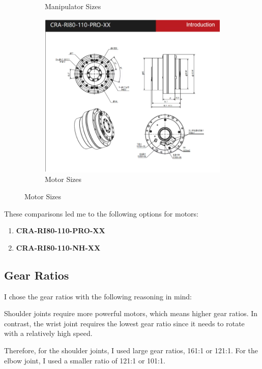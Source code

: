 \documentclass{article}
\begin{document}
\begin{figure}[H]
\begin{subfigure}{0.45\textwidth}
    \caption{Manipulator Sizes}
\end{subfigure} 
\hfill
\begin{subfigure}{0.45\textwidth}
    \centering
    \includegraphics[scale=0.25]{motor_sizes.png}
    \caption{Motor Sizes}
\end{subfigure}
\end{figure}


These comparisons led me to the following options for motors:

\begin{enumerate}
    \item \textbf{CRA-RI80-110-PRO-XX}
    \item \textbf{CRA-RI80-110-NH-XX}
\end{enumerate}

\subsection{Gear Ratios}

I chose the gear ratios with the following reasoning in mind:  

Shoulder joints require more powerful motors, which means higher gear ratios. In contrast, the wrist joint requires the lowest gear ratio since it needs to rotate with a relatively high speed.  

Therefore, for the shoulder joints, I used large gear ratios, 161:1 or 121:1.  
For the elbow joint, I used a smaller ratio of 121:1 or 101:1.  
\end{document}
